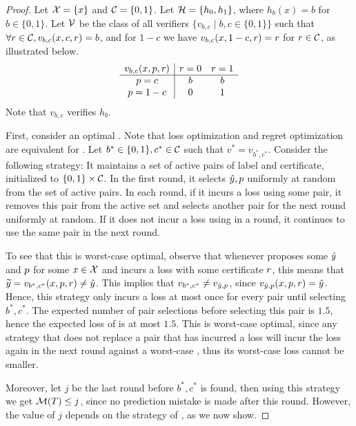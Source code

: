 \documentclass[11pt,letterpaper]{article}
\theoremstyle{definition}
\theoremstyle{plain}
\begin{document}
\begin{proof}
Let ${\mathcal X} = \{x\}$ and ${{\mathcal C}} = \{0,1\}$. Let ${{\mathcal H}} = \{h_0,h_1\}$, where $h_b(x) = b$ for  $b\in\{0,1\}$. Let ${\mathcal V}$ be the class of all verifiers $\{ v_{b,c} \mid b,c \in \{0,1\}\}$  such that $\forall {r} \in {{\mathcal C}}, v_{b,c}(x,c,{r}) = b$, and for $1-c$ we have $v_{b,c}(x,1-c,{r}) = {r}$ for ${r} \in {{\mathcal C}}$, as illustrated below.
\[
\begin{array}{c|cc}
 v_{b,c}(x,{p},{r}) & {r}=0 & {r}=1\\
\hline
{p}=c & b & b\\
{p} = 1-c & 0 & 1
\end{array}
\]
Note that $v_{b,c}$ verifies $h_b$. 

First, consider an optimal \dt. Note that loss optimization and regret optimization are equivalent for \dt. Let $b^* \in \{0,1\},c^*\in {{\mathcal C}}$ such that $v^* = v_{b^*,c^*}$. Consider the following \dt strategy: It maintains a set of active pairs of label and certificate, initialized to $\{0,1\}\times {{\mathcal C}}$. In the first round, it selects ${\hat{y}},{p}$ uniformly at random from the set of active pairs. In each round, if it incurs a loss using some pair, it removes this pair from the active set and selects another pair for the next round uniformly at random. If it does not incur a loss using in a round, it continues to use the same pair in the next round. 

To see that this is worst-case optimal, observe that whenever \dt proposes some ${\hat{y}}$ and ${p}$ for some $x \in {\mathcal X}$ and incurs a loss with some \df certificate ${r}$, this means that 
${\widetilde{y}} = v_{b^*,c^*}(x,{p},{r}) \neq {\hat{y}}$. This implies that $v_{b^*, c^*} \neq v_{{\hat{y}},{p}}$, since $v_{{\hat{y}},{p}}(x,{p},{r}) = {\hat{y}}$. Hence, this \dt strategy only incurs a loss at most once for every pair until selecting $b^*, c^*$. The expected number of pair selections before selecting this pair is $1.5$, hence the expected loss of \dt is at most $1.5$. This is worst-case optimal, since any strategy that does not replace a pair that has incurred a loss will incur the loss again in the next round against a worst-case \df, thus its worst-case loss cannot be smaller.

Moreover, let $j$ be the last round before $b^*,c^*$ is found, then using this \dt strategy we get ${\mathcal M}(T) \leq j$, since no prediction mistake is made after this round. However, the value of $j$ depends on the strategy of \df, as we now show.


\end{proof}
\end{document}
